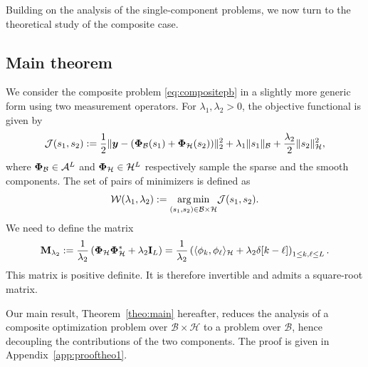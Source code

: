\documentclass[12pt]{article}
\begin{document}
    Building on the analysis of the single-component problems, we now turn to the theoretical study of the composite case.

    \subsection{Main theorem}

    We consider the composite problem \eqref{eq:compositepb} in a slightly more generic form using two measurement operators. For $\lambda_1, \lambda_2 > 0$, the objective functional is given by
    \begin{equation}
        \label{eq:composite-optim}
        \mathcal{J}(s_1, s_2) := \frac{1}{2} \| \bm{y} - (\bm{\Phi}_\mathcal{B} (s_1) + \bm{\Phi}_\mathcal{H} (s_2)) \|_2^2  + \lambda_{1} \| s_1 \|_{\mathcal{B}} + \frac{\lambda_{2}}{2} \| s_2 \|_{\mathcal{H}}^2,
    \end{equation}
    where $\bm{\Phi}_\mathcal{B} \in \mathcal{A}^L$ and $\bm{\Phi}_\mathcal{H}\in\mathcal{H}^L$ respectively sample the sparse and the smooth components. 
    The set of pairs of minimizers is defined as
    \begin{equation} \label{eq:argminisback}
        \mathcal{W} (\lambda_{1},\lambda_{2}) := \underset{(s_1,s_2) \in \mathcal{B} \times \mathcal{H}}{\arg\min} \mathcal{J}(s_1, s_2).
    \end{equation}
    We need to define the matrix
    \begin{equation}
        \label{eq:def-Mphi}
        \mathbf{M}_{\lambda_{2}} := \frac{1}{\lambda_{2}} \left(\bm{\Phi}_\mathcal{H}\bm{\Phi}_\mathcal{H}^* + \lambda_{2} \mathbf{I}_L\right) = \frac{1}{\lambda_{2}} \left( \langle \phi_k , \phi_\ell \rangle_{\mathcal{H}} + \lambda_{2} \delta[k - \ell] \right)_{1\leq k, \ell \leq L}.
    \end{equation}
    This matrix is positive definite. It is therefore invertible and admits a square-root matrix.

    Our main result, Theorem~\ref{theo:main} hereafter, reduces the analysis of a composite optimization problem over $\mathcal{B}\times\mathcal{H}$ to a problem over $\mathcal{B}$, hence decoupling the contributions of the two components. The proof is given in Appendix~\ref{app:prooftheo1}.
\end{document}
